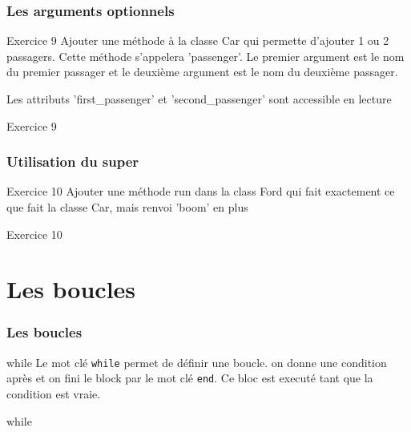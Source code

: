 \documentclass{beamer}
\begin{document}
\begin{frame}
  \frametitle{Les arguments optionnels}
  \begin{block}{Exercice 9}
  Ajouter une m\'ethode à la classe Car qui permette d'ajouter 1 ou 2 passagers. Cette m\'ethode s'appelera 'passenger'. Le premier argument est le nom du premier passager et le deuxième argument est le nom du deuxième passager.

  Les attributs 'first\_passenger' et 'second\_passenger' sont accessible en lecture
\end{block}
\end{frame}

\begin{frame}
  \begin{beamerboxesrounded}{Exercice 9}
    
  \end{beamerboxesrounded}
\end{frame}

\begin{frame}
  \frametitle{Utilisation du super}
  \begin{block}{Exercice 10}
  Ajouter une m\'ethode run dans la class Ford qui fait exactement ce que fait la classe Car, mais renvoi 'boom' en plus
\end{block}
\end{frame}

\begin{frame}
  \begin{beamerboxesrounded}{Exercice 10}
    
  \end{beamerboxesrounded}
\end{frame}

\section{Les boucles}

\begin{frame}
  \frametitle{Les boucles}
  \begin{block}{while}
    Le mot cl\'e \verb?while? permet de d\'efinir une boucle. on donne une condition après et on fini le block par le mot cl\'e \verb?end?. Ce bloc est execut\'e tant que la condition est vraie.
  \end{block}
\end{frame}

\begin{frame}
  \begin{block}{while}
    
  \end{block}
\end{frame}
\end{document}
